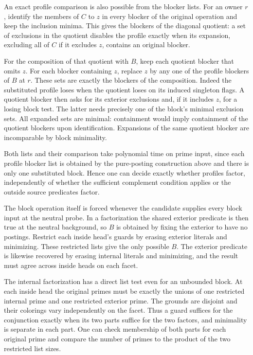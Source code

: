 An exact profile comparison is also possible from
the blocker lists. For an owner $r$, identify the
members of $C$ to $z$ in every blocker of the original
operation and keep the inclusion minima. This gives
the blockers of the diagonal quotient: a set of
exclusions in the quotient disables the profile
exactly when its expansion, excluding all of $C$
if it excludes $z$, contains an original blocker.

For the composition of that quotient with $B$,
keep each quotient blocker that omits $z$. For
each blocker containing $z$, replace $z$ by any
one of the profile blockers of $B$ at $r$. These
sets are exactly the blockers of the composition.
Indeed the substituted profile loses when the
quotient loses on its induced singleton flags.
A quotient blocker then asks for its exterior
exclusions and, if it includes $z$, for a losing
block test. The latter needs precisely one of
the block's minimal exclusion sets. All expanded
sets are minimal: containment would imply
containment of the quotient blockers upon
identification. Expansions of the same quotient
blocker are incomparable by block minimality.

Both lists and their comparison take polynomial
time on prime input, since each profile blocker
list is obtained by the pure-posting construction
above and there is only one substituted block.
Hence one can decide exactly whether profiles
factor, independently of whether the sufficient
complement condition applies or the outside
source predicates factor.

The block operation itself is forced whenever the
candidate supplies every block input at the neutral
probe. In a factorization the shared exterior
predicate is then true at the neutral background,
so $B$ is obtained by fixing the exterior to have
no postings. Restrict each inside head's guards by
erasing exterior literals and minimizing. These
restricted lists give the only possible $B$. The
exterior predicate is likewise recovered by
erasing internal literals and minimizing, and the
result must agree across inside heads on each facet.

The internal factorization has a direct list test
even for an unbounded block. At each inside head
the original primes must be exactly the unions of
one restricted internal prime and one restricted
exterior prime. The grounds are disjoint and their
colorings vary independently on the facet. Thus a
guard suffices for the conjunction exactly when its
two parts suffice for the two factors, and minimality
is separate in each part. One can check membership
of both parts for each original prime and compare
the number of primes to the product of the two
restricted list sizes.

